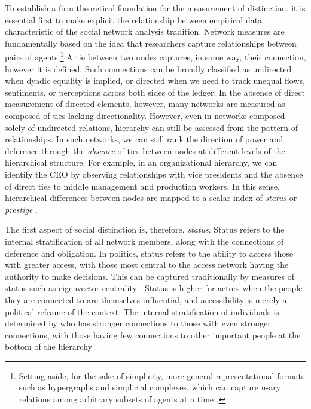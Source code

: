 \documentclass[12pt]{article}
\begin{document}
To establish a firm theoretical foundation for the measurement of distinction, it is essential first to make explicit the relationship between empirical data characteristic of the social network analysis tradition. Network measures are fundamentally based on the idea that researchers capture relationships between pairs of agents.\footnote{Setting aside, for the sake of simplicity, more general representational formats such as hypergraphs and simplicial complexes, which can capture n-ary relations among arbitrary subsets of agents at a time \citep{bonacich2004hyper-edges-532}.} A tie between two nodes captures, in some way, their connection, however it is defined. Such connections can be broadly classified as undirected when dyadic equality is implied, or directed when we need to track unequal flows, sentiments, or perceptions across both sides of the ledger. In the absence of direct measurement of directed elements, however, many networks are measured as composed of ties lacking directionality. However, even in networks composed solely of undirected relations, hierarchy can still be assessed from the pattern of relationships. In such networks, we can still rank the direction of power and deference through the \textit{absence} of ties between nodes at different levels of the hierarchical structure. For example, in an organizational hierarchy, we can identify the CEO by observing relationships with vice presidents and the absence of direct ties to middle management and production workers. In this sense, hierarchical differences between nodes are mapped to a scalar index of \textit{status} or \textit{prestige} \citep{burt1977positions-79a}.

The first aspect of social distinction is, therefore, \textit{status}. Status refers to the internal stratification of all network members, along with the connections of deference and obligation. In politics, status refers to the ability to access those with greater access, with those most central to the access network having the authority to make decisions. This can be captured traditionally by measures of status such as eigenvector centrality \citep{bonacich1972factoring-03e}. Status is higher for actors when the people they are connected to are themselves influential, and accessibility is merely a political reframe of the context. The internal stratification of individuals is determined by who has stronger connections to those with even stronger connections, with those having few connections to other important people at the bottom of the hierarchy \citep{bonacich1972factoring-03e}. 
\end{document}

